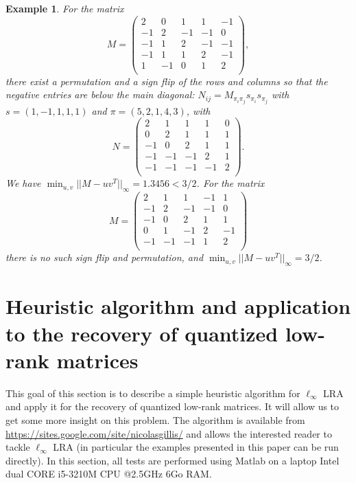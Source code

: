 \documentclass[a4paper,11pt]{article}
\newtheorem{example}{Example}
\numberwithin{equation}{section}
\begin{document}
\begin{example}
For the matrix 
\[
M = \left( \begin{array}{ccccc}
2 &  0 &  1 &  1 & -1 \\ 
-1 &  2 & -1 & -1 &  0 \\  
-1 &  1 &  2 & -1 & -1 \\ 
-1 &  1 &  1 &  2 & -1 \\ 
1 & -1 &  0 &  1 &  2 \\  
			\end{array} \right), 
		\]
	there exist a permutation and a sign flip of the rows and columns so that the negative entries are below the main diagonal: 
	 $N_{ij} = M_{\pi_i \pi_j} s_{\pi_i} s_{\pi_j}$ with	$s = (1,-1,1,1,1)$ and $\pi = (5,2,1,4,3)$, with 
	\[
	N = 
\left( \begin{array}{ccccc} 
  2 &   1 &   1 &   1 &   0 \\ 
  0 &   2 &   1 &   1 &   1 \\ 
 -1 &   0 &   2 &   1 &   1 \\ 
 -1 &  -1 &  -1 &   2 &   1 \\ 
 -1 &  -1 &  -1 &  -1 &   2 \\ 
\end{array} \right). 
		\] 
		We have $\min_{u,v} ||M-uv^T||_{\infty} = 1.3456 < 3/2$. 
For the matrix 
\[
M = \left( \begin{array}{ccccc}
 2  &   1 &   1&    -1 &    1 \\
    -1   &  2  &  -1   & -1 &    0  \\
    -1   &  0   &  2   &  1  &   1  \\
     0   &  1   & -1    & 2  &  -1  \\
    -1    &-1   & -1    & 1 &    2  \\ 
		\end{array} \right)
		\]
		there is no such sign flip and permutation, and $\min_{u,v} ||M-uv^T||_{\infty} = 3/2$.  
\end{example}


\section{Heuristic algorithm and application to the recovery of quantized low-rank matrices}  \label{algoappl}

This goal of this section is to describe a simple heuristic algorithm for $\ell_{\infty}$ LRA and apply it for the recovery of quantized low-rank matrices. It will allow us to get some more insight on this problem. 
The algorithm is available from \url{https://sites.google.com/site/nicolasgillis/} and allows the interested reader to tackle  $\ell_{\infty}$ LRA (in particular the examples presented in this paper can be run directly).  
In this section, all tests are performed using Matlab on a laptop Intel dual CORE i5-3210M CPU @2.5GHz 6Go RAM. 
\end{document}
